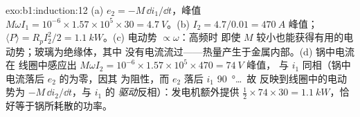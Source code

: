 \begin{solution}{exo:b1:induction:12}
(a) $e_2 = -M\,\dd i_1/\dd t$，峰值 $M\omega I_1 = 10^{-6} \times 1.57 \times 10^5 \times 30 =
\qty{4.7}{V}$。(b) $I_2 = 4.7/0.01 = \qty{470}{A}$ 峰值；$\langle P\rangle = R_pI_2^2/2
= \qty{1.1}{kW}$。(c) 电动势 $\propto\omega$：高频时
即使 $M$ 较小也能获得有用的电动势；玻璃为绝缘体，其中
没有电流流过——热量产生于金属内部。(d) 锅中电流在
线圈中感应出 $M\omega I_2 = 10^{-6} \times 1.57 \times 10^5 \times 470 = \qty{74}{V}$ 峰值，
与 $i_1$ 同相（锅中电流落后 $e_2$ 的为零，因其
为阻性，而 $e_2$ 落后 $i_1$ \qty{90}{\degree}\ldots\ 故
反映到线圈中的电动势为 $-M\,\dd i_2/\dd t$，与 $i_1$ 的
\emph{驱动}反相）：发电机额外提供 $\tfrac12 \times 74 \times 30 =
\qty{1.1}{kW}$，恰好等于锅所耗散的功率。
\end{solution}

